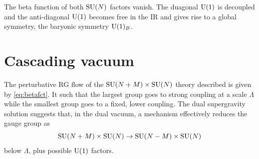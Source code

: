     The beta function of both $\text{SU}(N)$ factors vanish. The duagonal $\text{U}(1)$ is decoupled and the anti-diagonal $\text{U}(1)$ becomes free in the IR and gives rise to a global symmetry, the baryonic symmetry $\text{U}(1)_B$.

\section{Cascading vacuum}

    The perturbative RG flow of the $\text{SU}(N+M)\times\text{SU}(N)$ theory described is given by \eqref{eq:betafct}. It such that the largest group goes to strong coupling at a scale $\Lambda$ while the smallest group goes to a fixed, lower coupling. The dual supergravity solution suggests that, in the dual vacuum, a mechanism effectively reduces the gauge group as
    \begin{equation}
        \text{SU}(N+M)\times\text{SU}(N)\to\text{SU}(N-M)\times\text{SU}(N)\label{eq:gaugegroupereduction}
    \end{equation}
    below $\Lambda$, plus possible $\text{U}(1)$ factors. 
    
